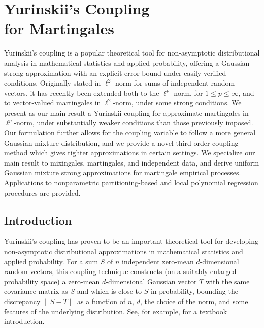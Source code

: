 
\chapter[Yurinskii's Coupling for Martingales]%
{Yurinskii's Coupling \\ for Martingales}
\label{ch:yurinskii}

Yurinskii's coupling is a popular theoretical tool for non-asymptotic
distributional analysis in mathematical statistics and applied probability,
offering a Gaussian strong approximation with an explicit error bound under
easily verified conditions. Originally stated in $\ell^2$-norm for sums of
independent random vectors, it has recently been extended both to the
$\ell^p$-norm, for $1 \leq p \leq \infty$, and to vector-valued martingales in
$\ell^2$-norm, under some strong conditions. We present as our main result a
Yurinskii coupling for approximate martingales in $\ell^p$-norm, under
substantially weaker conditions than those previously imposed. Our formulation
further allows for the coupling variable to follow a more general Gaussian
mixture distribution, and we provide a novel third-order coupling method which
gives tighter approximations in certain settings. We specialize our main result
to mixingales, martingales, and independent data, and derive uniform Gaussian
mixture strong approximations for martingale empirical processes. Applications
to nonparametric partitioning-based and local polynomial regression procedures
are provided.

\section{Introduction}

Yurinskii's coupling \citep{yurinskii1978error} has proven to be an important
theoretical tool for developing non-asymptotic distributional approximations in
mathematical statistics and applied probability. For a sum $S$ of $n$
independent zero-mean $d$-dimensional random vectors, this coupling technique
constructs (on a suitably enlarged probability space) a zero-mean
$d$-dimensional Gaussian vector $T$ with the same covariance matrix as $S$ and
which is close to $S$ in probability, bounding the discrepancy $\|S-T\|$ as a
function of $n$, $d$, the choice of the norm, and some features of the
underlying distribution. See, for example, \citet[Chapter 10]{pollard2002user}
for a textbook introduction.

